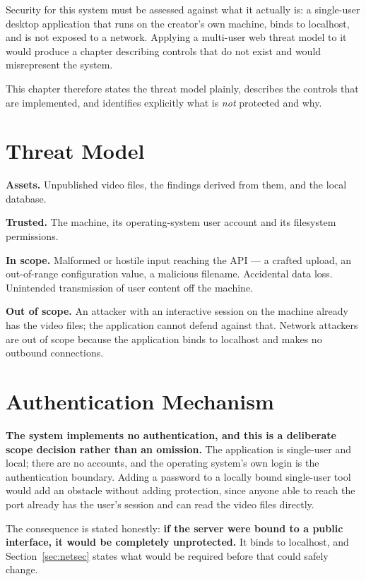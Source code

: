 \documentclass[
12pt,
a4paper,
oneside
]{report}
\begin{document}
Security for this system must be assessed against what it actually is: a
single-user desktop application that runs on the creator's own machine, binds to
localhost, and is not exposed to a network. Applying a multi-user web threat
model to it would produce a chapter describing controls that do not exist and
would misrepresent the system.

This chapter therefore states the threat model plainly, describes the controls
that are implemented, and identifies explicitly what is \emph{not} protected and
why.

\section{Threat Model}

\textbf{Assets.} Unpublished video files, the findings derived from them, and
the local database.

\textbf{Trusted.} The machine, its operating-system user account and its
filesystem permissions.

\textbf{In scope.} Malformed or hostile input reaching the API --- a crafted
upload, an out-of-range configuration value, a malicious filename. Accidental
data loss. Unintended transmission of user content off the machine.

\textbf{Out of scope.} An attacker with an interactive session on the machine
already has the video files; the application cannot defend against that. Network
attackers are out of scope because the application binds to localhost and makes
no outbound connections.

\section{Authentication Mechanism}

\textbf{The system implements no authentication, and this is a deliberate scope
decision rather than an omission.} The application is single-user and local;
there are no accounts, and the operating system's own login is the authentication
boundary. Adding a password to a locally bound single-user tool would add an
obstacle without adding protection, since anyone able to reach the port already
has the user's session and can read the video files directly.

The consequence is stated honestly: \textbf{if the server were bound to a
public interface, it would be completely unprotected.} It binds to localhost,
and Section~\ref{sec:netsec} states what would be required before that could
safely change.
\end{document}
